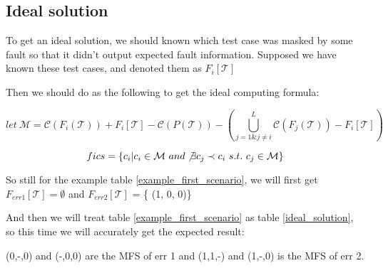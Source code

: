 \documentclass{sig-alternate}
\begin{document}
\subsection{Ideal solution}
To get an ideal solution, we should known which test case was masked by some fault so that it didn't output expected fault information. Supposed we have known these test cases, and denoted them as $F_{i}[\mathcal{T}]$

%
%
%
%


Then we should do as the following to get the ideal computing formula:

$$let\ \mathcal{M} = \mathcal{C}(F_{i}(\mathcal{T})) + F_{i}[\mathcal{T}]  - \mathcal{C}(P(\mathcal{T})) - (\bigcup_{j = 1 \& j \neq i }^{L}\mathcal{C}(F_{j}(\mathcal{T})) - F_{i}[\mathcal{T}])$$

$$fics = \{c_{i} | c_{i} \in \mathcal{M} \ and \not\exists c_{j} \prec c_{i}\ s.t.\ c_{j} \in \mathcal{M} \}$$


So still for the example table \ref{example_first_scenario}, we will first get
 $F_{err1}[\mathcal{T}]= \emptyset $ and  $F_{err2}[\mathcal{T}]$ = \{ (1, 0, 0)\}

And then we will treat table \ref{example_first_scenario} as table \ref{ideal_solution}, so this time we will accurately get the expected result:

(0,-,0) and (-,0,0) are the MFS of err 1 and (1,1,-) and (1,-,0) is the MFS of err 2.
\end{document}
